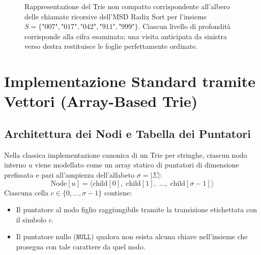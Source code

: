 \begin{figure}[H]
{%
}
\caption{Rappresentazione del Trie non compatto corrispondente all'albero delle chiamate ricorsive dell'MSD Radix Sort per l'insieme $S = \{\text{"007"}, \text{"017"}, \text{"042"}, \text{"911"}, \text{"999"}\}$. Ciascun livello di profondit\`a corrisponde alla cifra esaminata; una visita anticipata da sinistra verso destra restituisce le foglie perfettamente ordinate.}
\label{fig:trie-uncompacted-msd}
\end{figure}

\FloatBarrier
\section{Implementazione Standard tramite Vettori (Array-Based Trie)}
\label{sec:array-based-trie}

\FloatBarrier
\subsection{Architettura dei Nodi e Tabella dei Puntatori}
\label{subsec:architettura-array-based}

Nella classica implementazione canonica di un Trie per stringhe, ciascun nodo interno $u$ viene modellato come un array statico di puntatori di dimensione prefissata e pari all'ampiezza dell'alfabeto $\sigma = |\Sigma|$:
\begin{equation}
  \text{Node}[u] = \langle \text{child}[0], \; \text{child}[1], \; \dots, \; \text{child}[\sigma - 1] \rangle
\end{equation}
Ciascuna cella $c \in \{0, \dots, \sigma - 1\}$ contiene:
\begin{itemize}
  \item Il puntatore al nodo figlio raggiungibile tramite la transizione etichettata con il simbolo $c$.
  \item Il puntatore nullo ($\texttt{NULL}$) qualora non esista alcuna chiave nell'insieme che prosegua con tale carattere da quel nodo.
\end{itemize}

